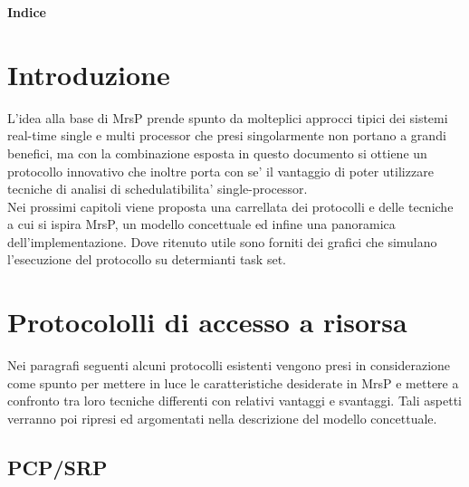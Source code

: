 \documentclass[a4paper,11pt]{article}
\begin{document}


\textbf{Indice}

\tableofcontents

\newpage

\section{Introduzione}

\noindent L'idea alla base di MrsP prende spunto da molteplici approcci tipici dei sistemi real-time single e multi processor che presi singolarmente non portano a grandi benefici, ma con la combinazione esposta in questo documento si ottiene un protocollo innovativo che inoltre porta con se' il vantaggio di poter utilizzare tecniche di analisi di schedulatibilita' single-processor.\\

\noindent Nei prossimi capitoli viene proposta una carrellata dei protocolli e delle tecniche a cui si ispira MrsP, un modello concettuale ed infine una panoramica dell'implementazione. Dove ritenuto utile sono forniti dei grafici che simulano l'esecuzione del protocollo su determianti task set.\\

\newpage

\section{Protocololli di accesso a risorsa}

\noindent Nei paragrafi seguenti alcuni protocolli esistenti vengono presi in considerazione come spunto per mettere in luce le caratteristiche desiderate in MrsP e mettere a confronto tra loro tecniche differenti con relativi vantaggi e svantaggi. Tali aspetti verranno poi ripresi ed argomentati nella descrizione del modello concettuale.\\

\subsection{PCP/SRP}
\end{document}
